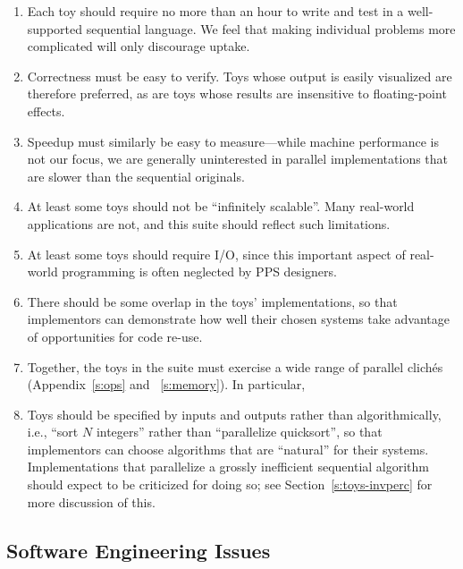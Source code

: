 \begin{enumerate}

\item	Each toy should require no more than an hour
	to write and test in a well-supported sequential language.
	We feel that making individual problems more complicated will only discourage uptake.

\item	Correctness must be easy to verify.
	Toys whose output is easily visualized are therefore preferred,
	as are toys whose results are insensitive to floating-point effects.

\item	Speedup must similarly be easy to measure---while machine performance is not our focus,
	we are generally uninterested in parallel implementations that are slower than
	the sequential originals.

\item	At least some toys should not be ``infinitely scalable''.
	Many real-world applications are not,
	and this suite should reflect such limitations.

\item	At least some toys should require I/O,
	since this important aspect of real-world programming is often neglected by PPS designers.

\item	There should be some overlap in the toys' implementations,
	so that implementors can demonstrate how well
	their chosen systems take advantage of opportunities for code re-use.

\item	Together,
	the toys in the suite must exercise a wide range of parallel clich\'{e}s
	(Appendix~\ref{s:ops} and ~\ref{s:memory}).
	In particular,

\item	Toys should be specified by inputs and outputs rather than algorithmically,
	i.e.,
	``sort $N$ integers'' rather than ``parallelize quicksort'',
	so that implementors can choose algorithms that are ``natural'' for their systems.
	Implementations that parallelize a grossly inefficient sequential algorithm
	should expect to be criticized for doing so;
	see Section~\ref{s:toys-invperc} for more discussion of this.

\end{enumerate}

\subsection{Software Engineering Issues\label{s:method-softeng}}

